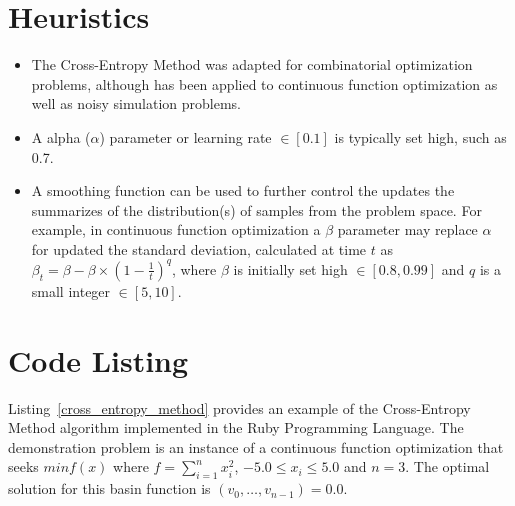 \documentclass[a4paper, 11pt]{article}
\begin{document}
\section{Heuristics}
\label{sec:heuristics}
\begin{itemize}
	\item The Cross-Entropy Method was adapted for combinatorial optimization problems, although has been applied to continuous function optimization as well as noisy simulation problems.
	\item A alpha ($\alpha$) parameter or learning rate $\in [0.1]$ is typically set high, such as 0.7.
	\item A smoothing function can be used to further control the updates the summarizes of the distribution(s) of samples from the problem space. For example, in continuous function optimization a $\beta$ parameter may replace $\alpha$ for updated the standard deviation, calculated at time $t$ as $\beta_{t} = \beta - \beta \times (1-\frac{1}{t})^q$, where $\beta$ is initially set high $\in [0.8, 0.99]$ and $q$ is a small integer $\in [5, 10]$.
\end{itemize}

\section{Code Listing}
\label{sec:code}
Listing~\ref{cross_entropy_method} provides an example of the Cross-Entropy Method algorithm implemented in the Ruby Programming Language. 
The demonstration problem is an instance of a continuous function optimization that seeks $min f(x)$ where $f=\sum_{i=1}^n x_{i}^2$, $-5.0\leq x_i \leq 5.0$ and $n=3$. The optimal solution for this basin function is $(v_0,\ldots,v_{n-1})=0.0$.
\end{document}
